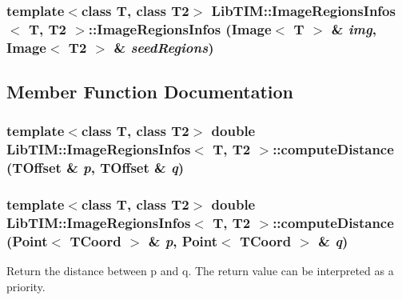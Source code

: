 \subsubsection{\setlength{\rightskip}{0pt plus 5cm}template$<$class T, class T2$>$ {\bf Lib\-TIM::Image\-Regions\-Infos}$<$ T, T2 $>$::{\bf Image\-Regions\-Infos} ({\bf Image}$<$ T $>$ \& {\em img}, {\bf Image}$<$ T2 $>$ \& {\em seed\-Regions})\hspace{0.3cm}{\tt  [inline]}}\label{classLibTIM_1_1ImageRegionsInfos_a0}




\subsection{Member Function Documentation}
\subsubsection{\setlength{\rightskip}{0pt plus 5cm}template$<$class T, class T2$>$ double {\bf Lib\-TIM::Image\-Regions\-Infos}$<$ T, T2 $>$::compute\-Distance ({\bf TOffset} \& {\em p}, {\bf TOffset} \& {\em q})\hspace{0.3cm}{\tt  [inline]}}\label{classLibTIM_1_1ImageRegionsInfos_a2}


\subsubsection{\setlength{\rightskip}{0pt plus 5cm}template$<$class T, class T2$>$ double {\bf Lib\-TIM::Image\-Regions\-Infos}$<$ T, T2 $>$::compute\-Distance ({\bf Point}$<$ {\bf TCoord} $>$ \& {\em p}, {\bf Point}$<$ {\bf TCoord} $>$ \& {\em q})\hspace{0.3cm}{\tt  [inline]}}\label{classLibTIM_1_1ImageRegionsInfos_a1}


Return the distance between p and q. The return value can be interpreted as a priority. 

